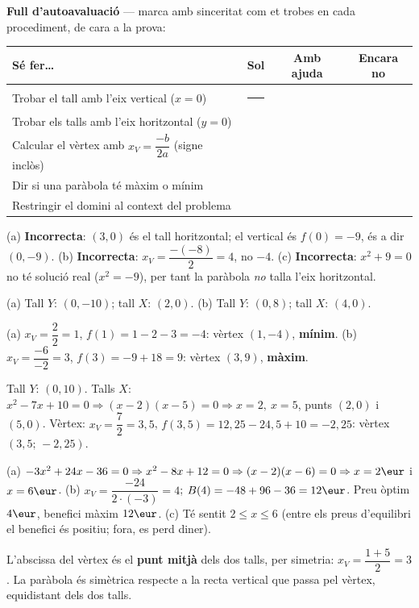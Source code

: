 \begin{idea}
\textbf{Full d'autoavaluació} — marca amb sinceritat com et trobes en cada
procediment, de cara a la prova:
\begin{center}
\renewcommand{\arraystretch}{1.4}
\begin{tabular}{p{8.2cm} c c c}
\toprule
\textbf{Sé fer\dots} & \textbf{Sol} & \textbf{Amb ajuda} & \textbf{Encara no} \\
\midrule
Trobar el tall amb l'eix vertical ($x=0$) & \rule{0.7cm}{0pt} & & \\
Trobar els talls amb l'eix horitzontal ($y=0$) & & & \\
Calcular el vèrtex amb $x_V=\dfrac{-b}{2a}$ (signe inclòs) & & & \\
Dir si una paràbola té màxim o mínim & & & \\
Restringir el domini al context del problema & & & \\
\bottomrule
\end{tabular}
\end{center}
\end{idea}

\begin{solucions}
\begin{sollist}
  \item (a) \textbf{Incorrecta}: $(3,0)$ és el tall horitzontal; el vertical és
        $f(0)=-9$, és a dir $(0,-9)$. \quad
        (b) \textbf{Incorrecta}: $x_V=\dfrac{-(-8)}{2}=4$, no $-4$. \quad
        (c) \textbf{Incorrecta}: $x^2+9=0$ no té solució real ($x^2=-9$), per tant la
        paràbola \emph{no} talla l'eix horitzontal.
  \item (a) Tall $Y$: $(0,-10)$; tall $X$: $(2,0)$. \quad
        (b) Tall $Y$: $(0,8)$; tall $X$: $(4,0)$.
  \item (a) $x_V=\dfrac{2}{2}=1$, $f(1)=1-2-3=-4$: vèrtex $(1,-4)$, \textbf{mínim}. \quad
        (b) $x_V=\dfrac{-6}{-2}=3$, $f(3)=-9+18=9$: vèrtex $(3,9)$, \textbf{màxim}.
  \item Tall $Y$: $(0,10)$. Talls $X$: $x^2-7x+10=0 \Rightarrow (x-2)(x-5)=0
        \Rightarrow x=2,\ x=5$, punts $(2,0)$ i $(5,0)$. Vèrtex:
        $x_V=\dfrac{7}{2}=3,5$, $f(3,5)=12,25-24,5+10=-2,25$: vèrtex $(3,5;\,-2,25)$.
  \item (a) $-3x^2+24x-36=0 \Rightarrow x^2-8x+12=0 \Rightarrow (x-2)(x-6)=0
        \Rightarrow x=2\eur$ i $x=6\eur$. \quad
        (b) $x_V=\dfrac{-24}{2\cdot(-3)}=4$; $B(4)=-48+96-36=12\eur$. Preu òptim
        $4\eur$, benefici màxim $12\eur$. \quad
        (c) Té sentit $2\le x\le 6$ (entre els preus d'equilibri el benefici és
        positiu; fora, es perd diner).
  \item L'abscissa del vèrtex és el \textbf{punt mitjà} dels dos talls, per simetria:
        $x_V=\dfrac{1+5}{2}=3$. La paràbola és simètrica respecte a la recta vertical
        que passa pel vèrtex, equidistant dels dos talls.
\end{sollist}
\end{solucions}
